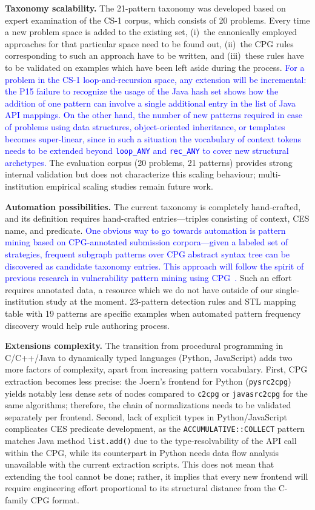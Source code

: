 \textbf{Taxonomy scalability.} The 21-pattern taxonomy was developed based on expert examination of the CS-1 corpus, which consists of 20 problems. Every time a new problem space is added to the existing set, (i)~the canonically employed approaches for that particular space need to be found out, (ii)~the CPG rules corresponding to such an approach have to be written, and (iii)~these rules have to be validated on examples which have been left aside during the process. \textcolor{blue}{For a problem in the CS-1 loop-and-recursion space, any extension will be incremental: the P15 failure to recognize the usage of the Java hash set shows how the addition of one pattern can involve a single additional entry in the list of Java API mappings. On the other hand, the number of new patterns required in case of problems using data structures, object-oriented inheritance, or templates becomes super-linear, since in such a situation the vocabulary of context tokens needs to be extended beyond \texttt{loop\_ANY} and \texttt{rec\_ANY} to cover new structural archetypes.} The evaluation corpus (20 problems, 21 patterns) provides strong internal validation but does not characterize this scaling behaviour; multi-institution empirical scaling studies remain future work.

\textbf{Automation possibilities.} The current taxonomy is completely hand-crafted, and its definition requires hand-crafted entries---triples consisting of context, CES name, and predicate. \textcolor{blue}{One obvious way to go towards automation is pattern mining based on CPG-annotated submission corpora---given a labeled set of strategies, frequent subgraph patterns over CPG abstract syntax tree can be discovered as candidate taxonomy entries. This approach will follow the spirit of previous research in vulnerability pattern mining using CPG~\cite{ref_yamaguchi2014}.} Such an effort requires annotated data, a resource which we do not have outside of our single-institution study at the moment. 23-pattern detection rules and STL mapping table with 19 patterns are specific examples when automated pattern frequency discovery would help rule authoring process.

\textbf{Extensions complexity.} The transition from procedural programming in C/C++/Java to dynamically typed languages (Python, JavaScript) adds two more factors of complexity, apart from increasing pattern vocabulary. First, CPG extraction becomes less precise: the Joern's frontend for Python (\texttt{pysrc2cpg}) yields notably less dense sets of nodes compared to \texttt{c2cpg} or \texttt{javasrc2cpg} for the same algorithms; therefore, the chain of normalizations needs to be validated separately per frontend. Second, lack of explicit types in Python/JavaScript complicates CES predicate development, as the \texttt{ACCUMULATIVE::COLLECT} pattern matches Java method \texttt{list.add()} due to the type-resolvability of the API call within the CPG, while its counterpart in Python needs data flow analysis unavailable with the current extraction scripts. This does not mean that extending the tool cannot be done; rather, it implies that every new frontend will require engineering effort proportional to its structural distance from the C-family CPG format.


